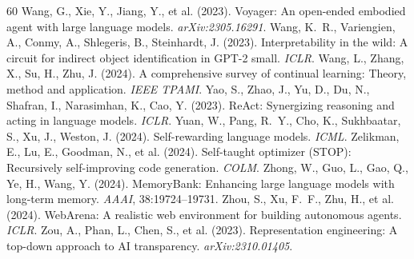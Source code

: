 \documentclass[11pt]{article}
\begin{document}
\begin{thebibliography}{60}
 Wang, G., Xie, Y., Jiang, Y., et al. (2023). Voyager: An open-ended embodied agent with large language models. \emph{arXiv:2305.16291}.
 Wang, K.~R., Variengien, A., Conmy, A., Shlegeris, B., Steinhardt, J. (2023). Interpretability in the wild: A circuit for indirect object identification in GPT-2 small. \emph{ICLR}.
 Wang, L., Zhang, X., Su, H., Zhu, J. (2024). A comprehensive survey of continual learning: Theory, method and application. \emph{IEEE TPAMI}.
 Yao, S., Zhao, J., Yu, D., Du, N., Shafran, I., Narasimhan, K., Cao, Y. (2023). ReAct: Synergizing reasoning and acting in language models. \emph{ICLR}.
 Yuan, W., Pang, R.~Y., Cho, K., Sukhbaatar, S., Xu, J., Weston, J. (2024). Self-rewarding language models. \emph{ICML}.
 Zelikman, E., Lu, E., Goodman, N., et al. (2024). Self-taught optimizer (STOP): Recursively self-improving code generation. \emph{COLM}.
 Zhong, W., Guo, L., Gao, Q., Ye, H., Wang, Y. (2024). MemoryBank: Enhancing large language models with long-term memory. \emph{AAAI}, 38:19724--19731.
 Zhou, S., Xu, F.~F., Zhu, H., et al. (2024). WebArena: A realistic web environment for building autonomous agents. \emph{ICLR}.
 Zou, A., Phan, L., Chen, S., et al. (2023). Representation engineering: A top-down approach to AI transparency. \emph{arXiv:2310.01405}.
\end{thebibliography}
\end{document}
